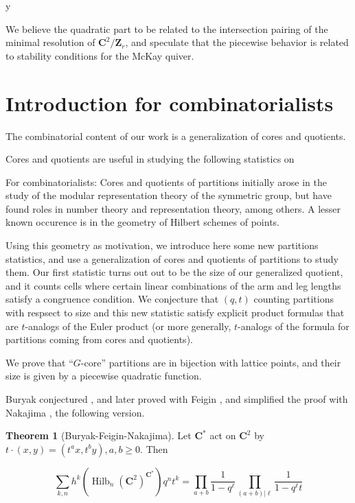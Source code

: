 y\documentclass{amsart}[12pt]
\theoremstyle{definition}
\newtheorem{theorem}[dummy]{Theorem}
\newcommand{\Z}{\mathbf{Z}}
\newcommand{\C}{\mathbf{C}}
\DeclareMathOperator{\Hilb}{Hilb}
\begin{document}
We believe the quadratic part to be related to the intersection pairing of the minimal resolution of $\C^2/\Z_r$, and speculate that the piecewise behavior is related to stability conditions for the McKay quiver.




\section{Introduction for combinatorialists}

The combinatorial content of our work is a generalization of cores and quotients.  

Cores and quotients are useful in studying the following statistics on 



For combinatorialists: Cores and quotients of partitions initially arose in the study of the modular representation theory of the symmetric group, but have found roles in number theory and representation theory, among others.  A lesser known occurence is in the geometry of Hilbert schemes of points.  

Using this geometry as motivation, we introduce here some new partitions statistics, and use a generalization of cores and quotients of partitions to study them.  Our first statistic turns out out to be the size of our generalized quotient, and it counts cells where certain linear combinations of the arm and leg lengths satisfy a congruence condition.  We conjecture that $(q,t)$ counting partitions with respsect to size and this new statistic satisfy explicit product formulas that are $t$-analogs of the Euler product (or more generally, $t$-analogs of the formula for partitions coming from cores and quotients).  

We prove that ``$G$-core'' partitions are in bijection with lattice points, and their size is given by a piecewise quadratic function.  




Buryak conjectured \cite{Buryak}, and later proved with Feigin \cite{BF}, and simplified the proof with Nakajima \cite{BFN}, the following version. 

\begin{theorem}[Buryak-Feigin-Nakajima] \label{thm:BFN}
Let $\C^*$ act on $\C^2$ by $t\cdot (x,y)=(t^ax, t^by), a,b\geq 0$.  Then

$$\sum_{k,n} h^k(\Hilb_n(\C^2)^{\C^*})q^nt^k=\prod_{a+b } \frac{1}{1-q^\ell}\prod_{(a+b)|\ell} \frac{1}{1-q^\ell t}$$
\end{theorem}
\end{document}
